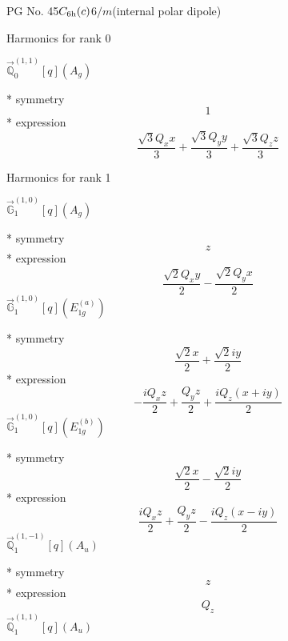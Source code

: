 \documentclass[fleqn,8pt]{jsarticle}
\begin{document}
\setcounter{MaxMatrixCols}{32}

\renewcommand{\tablename}{Table~}
\renewcommand{\figurename}{Figure~}
\begin{center}
\LARGE
PG No. 45\quad$C_{\rm 6h}(c)$\quad$6/m$\quad[ hexagonal ] (internal polar dipole)
\end{center}

\noindent * Harmonics for rank 0

\noindent\quad $\vec{\mathbb{Q}}_{0}^{(1,1)}[q](A_{g})$

\noindent\quad ** symmetry
\begin{dmath*}
1
\end{dmath*}
\noindent\quad ** expression
\begin{dmath*}
\frac{\sqrt{3} Q_{x} x}{3} + \frac{\sqrt{3} Q_{y} y}{3} + \frac{\sqrt{3} Q_{z} z}{3}
\end{dmath*}

\noindent * Harmonics for rank 1

\noindent\quad $\vec{\mathbb{G}}_{1}^{(1,0)}[q](A_{g})$

\noindent\quad ** symmetry
\begin{dmath*}
z
\end{dmath*}
\noindent\quad ** expression
\begin{dmath*}
\frac{\sqrt{2} Q_{x} y}{2} - \frac{\sqrt{2} Q_{y} x}{2}
\end{dmath*}
\noindent\quad $\vec{\mathbb{G}}_{1}^{(1,0)}[q](E_{1g}^{(a)})$

\noindent\quad ** symmetry
\begin{dmath*}
\frac{\sqrt{2} x}{2} + \frac{\sqrt{2} i y}{2}
\end{dmath*}
\noindent\quad ** expression
\begin{dmath*}
- \frac{i Q_{x} z}{2} + \frac{Q_{y} z}{2} + \frac{i Q_{z} \left(x + i y\right)}{2}
\end{dmath*}
\noindent\quad $\vec{\mathbb{G}}_{1}^{(1,0)}[q](E_{1g}^{(b)})$

\noindent\quad ** symmetry
\begin{dmath*}
\frac{\sqrt{2} x}{2} - \frac{\sqrt{2} i y}{2}
\end{dmath*}
\noindent\quad ** expression
\begin{dmath*}
\frac{i Q_{x} z}{2} + \frac{Q_{y} z}{2} - \frac{i Q_{z} \left(x - i y\right)}{2}
\end{dmath*}
\noindent\quad $\vec{\mathbb{Q}}_{1}^{(1,-1)}[q](A_{u})$

\noindent\quad ** symmetry
\begin{dmath*}
z
\end{dmath*}
\noindent\quad ** expression
\begin{dmath*}
Q_{z}
\end{dmath*}
\noindent\quad $\vec{\mathbb{Q}}_{1}^{(1,1)}[q](A_{u})$
\end{document}
